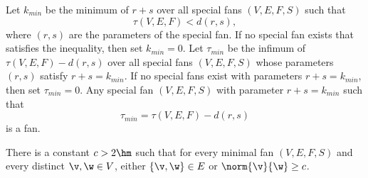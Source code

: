 \begin{definition}
Let $k_{min}$ be the minimum of $r+s$ over
all special fans $(V,E,F,S)$ such that 
\begin{equation}\label{eqn:kmin}
\tau(V,E,F) < d (r,s),
\end{equation}
where $(r,s)$ are the parameters of the special fan.  If no special fan exists that satisfies the inequality, then set $k_{min}=0$.  Let
$\tau_{min}$ be the infimum of $\tau(V,E,F)-d(r,s)$ over all special fans $(V,E,F,S)$ whose parameters $(r,s)$ satisfy $r+s=k_{min}$.  If
no special fans exist with parameters $r+s=k_{min}$, then set
$\tau_{min}=0$.  Any special fan $(V,E,F,S)$ with parameter
$r+s=k_{min}$ such that
\begin{displaymath}
\tau_{min}= \tau(V,E,F)-d(r,s)
\end{displaymath}
is a  fan.
\end{definition}


\begin{lemma}[]\label{lemma:c-bound}
There is a constant $c>2\hm$ such that for every minimal fan
$(V,E,F,S)$ and every distinct $\v,\w\in V$, either $\{\v,\w\}\in E$
or $\norm{\v}{\w}\ge c$.
\end{lemma}

